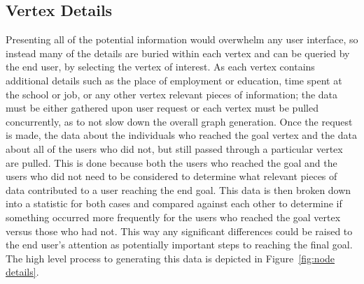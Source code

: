 \subsection{Vertex Details}
Presenting all of the potential information would overwhelm any user interface,
so instead many of the details are buried within each vertex and can be queried
by the end user, by selecting the vertex of interest.  As each vertex contains
additional details such as the place of employment or education, time spent at
the school or job, or any other vertex relevant pieces of information; the data
must be either gathered upon user request or each vertex must be pulled
concurrently, as to not slow down the overall graph generation.  Once the
request is made, the data about the individuals who reached the goal vertex and
the data about all of the users who did not, but still passed through a
particular vertex are pulled.  This is done because both the users who reached
the goal and the users who did not need to be considered to determine what
relevant pieces of data contributed to a user reaching the end goal.  This data
is then broken down into a statistic for both cases and compared against each
other to determine if something occurred more frequently for the users who
reached the goal vertex versus those who had not.  This way any significant
differences could be raised to the end user's attention as potentially important
steps to reaching the final goal.  The high level process to generating this
data is depicted in Figure~\ref{fig:node details}.

\usetikzlibrary{shapes,arrows,chains}

